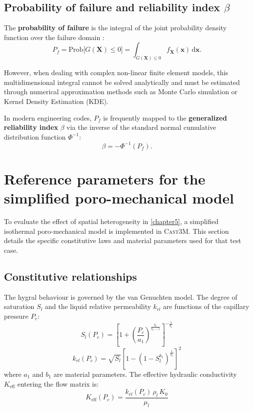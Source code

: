 \subsection{Probability of failure and reliability index $\beta$}
The \textbf{probability of failure} is the integral of the joint probability density function over the failure domain \cite{baroth2011}:
\begin{equation}
    P_f = \mathrm{Prob}\bigl[G(\mathbf{X}) \leq 0\bigr] = \int_{G(\mathbf{X}) \leq 0} f_{\mathbf{X}}(\mathbf{x}) \,\mathrm{d}\mathbf{x}.
    \label{eq:pf}
\end{equation}

However, when dealing with complex non-linear finite element models, this multidimensional integral cannot be solved analytically and must be estimated through numerical approximation methods such as Monte Carlo simulation or Kernel Density Estimation (KDE).

In modern engineering codes, $P_f$ is frequently mapped to the \textbf{generalized reliability index} $\beta$ via the inverse of the standard normal cumulative distribution function $\Phi^{-1}$:
\begin{equation}
    \beta = -\Phi^{-1}(P_f).
    \label{eq:beta-generalized}
\end{equation}

\section{Reference parameters for the simplified poro-mechanical model} \label{sec:simplified-model-inputs}
To evaluate the effect of spatial heterogeneity in \cref{chapter5}, a simplified isothermal poro-mechanical model is implemented in \textsc{Cast3M}. This section details the specific constitutive laws and material parameters used for that test case.

\subsection{Constitutive relationships}
The hygral behaviour is governed by the van Genuchten model. The degree of saturation $S_l$ and the liquid relative permeability $k_{rl}$ are functions of the capillary pressure $P_c$:
\begin{equation}
    S_l(P_c) = \left[ 1 + \left(\frac{P_c}{a_1}\right)^{\frac{b_1}{b_1-1}} \right]^{-\frac{1}{b_1}}
\end{equation}
\begin{equation}
    k_{rl}(P_c) = \sqrt{S_l} \left[ 1 - \left(1 - S_l^{b_1}\right)^{\frac{1}{b_1}} \right]^2
\end{equation}
where $a_1$ and $b_1$ are material parameters. The effective hydraulic conductivity $K_{\mathrm{eff}}$ entering the flow matrix is:
\begin{equation}
    K_{\mathrm{eff}}(P_c) = \frac{k_{rl}(P_c)\,\rho_l\,K_0}{\mu_l}
\end{equation}

